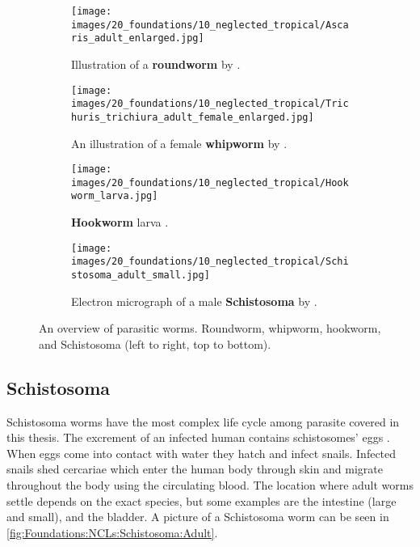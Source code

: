 \begin{figure}
    \begin{subfigure}[t]{0.45\textwidth}
        \centering
        \texttt{[image: images/20\_foundations/10\_neglected\_tropical/Ascaris\_adult\_enlarged.jpg]}
        \caption{Illustration of a \textbf{roundworm} by \textcite{blainville1824traite}.}
        \label{fig:Foundations:NCLs:STHs:Ascaris}
        \vspace*{2mm}
    \end{subfigure}
    \hfill
    \begin{subfigure}[t]{0.45\textwidth}
        \centering
        \texttt{[image: images/20\_foundations/10\_neglected\_tropical/Trichuris\_trichiura\_adult\_female\_enlarged.jpg]}
        \caption{An illustration of a female \textbf{whipworm} by \textcite{blainville1824traite}.}
        \label{fig:Foundations:NCLs:STHs:Whipworm:Adult}
        \vspace*{2mm}
    \end{subfigure}
    \begin{subfigure}[t]{0.45\textwidth}
        \centering
        \texttt{[image: images/20\_foundations/10\_neglected\_tropical/Hookworm\_larva.jpg]}
        \caption{\textbf{Hookworm} larva \cite{dpdx2019hookworm}.}
        \label{fig:Foundations:NCLs:STHs:Hookworm:Adult}
    \end{subfigure}    
    \hfill
    \begin{subfigure}[t]{0.45\textwidth}
        \centering
        \texttt{[image: images/20\_foundations/10\_neglected\_tropical/Schistosoma\_adult\_small.jpg]}
        \caption{Electron micrograph of a male \textbf{Schistosoma} by \textcite{davidwilliams2009schistosoma}.}
        \label{fig:Foundations:NCLs:Schistosoma:Adult}
    \end{subfigure}
    \caption{An overview of parasitic worms. Roundworm, whipworm, hookworm, and Schistosoma (left to right, top to bottom).}
    \label{fig:Foundations:NCLs:Overview}
\end{figure}


\subsection{Schistosoma}
\label{sec:Foundations:NTDs:STHs:Schistosoma}

Schistosoma worms have the most complex life cycle among parasite covered in this thesis. The excrement of an infected human contains schistosomes' eggs \cite{nelwan2019schistosomiasis}. When eggs come into contact with water they hatch and infect snails. Infected snails shed cercariae which enter the human body through skin and migrate throughout the body using the circulating blood. The location where adult worms settle depends on the exact species, but some examples are the intestine (large and small), and the bladder. A picture of a Schistosoma worm can be seen in \autoref{fig:Foundations:NCLs:Schistosoma:Adult}.

